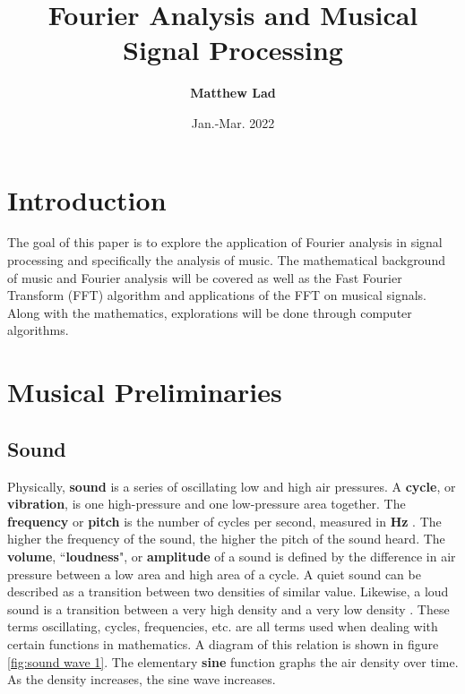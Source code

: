 \documentclass[10pt]{article}
\title{
    \textbf{Fourier Analysis and Musical Signal Processing}}
\author{\textbf{Matthew Lad}}
\date{Jan.-Mar. 2022}
\begin{document}
 
\maketitle

\section{Introduction}
\hspace{\parindent} The goal of this paper is to explore the application of Fourier analysis in signal processing and specifically the analysis of music. The mathematical background of music and Fourier analysis will be covered as well as the Fast Fourier Transform (FFT) algorithm and applications of the FFT on musical signals. Along with the mathematics, explorations will be done through computer algorithms.

\section{Musical Preliminaries}
\subsection{Sound}
\hspace{\parindent}Physically, \textbf{sound} is a series of oscillating low and high air pressures. A \textbf{cycle}, or \textbf{vibration}, is one high-pressure and one low-pressure area together. The \textbf{frequency} or \textbf{pitch} is the number of cycles per second, measured in \textbf{Hz} \cite{hertzDefinition}. The higher the frequency of the sound, the higher the pitch of the sound heard. The \textbf{volume}, \textquotedblleft\textbf{loudness}", or \textbf{amplitude} of a sound is defined by the difference in air pressure between a low area and high area of a cycle. A quiet sound can be described as a transition between two densities of similar value. Likewise, a loud sound is a transition between a very high density and a very low density \cite{boatwright1956musictheory} \cite{lenssen2014fouriermusic}. These terms oscillating, cycles, frequencies, etc. are all terms used when dealing with certain functions in mathematics. A diagram of this relation is shown in figure \ref{fig:sound wave 1}. The elementary \textbf{sine} function graphs the air density over time. As the density increases, the sine wave increases.
\end{document}
